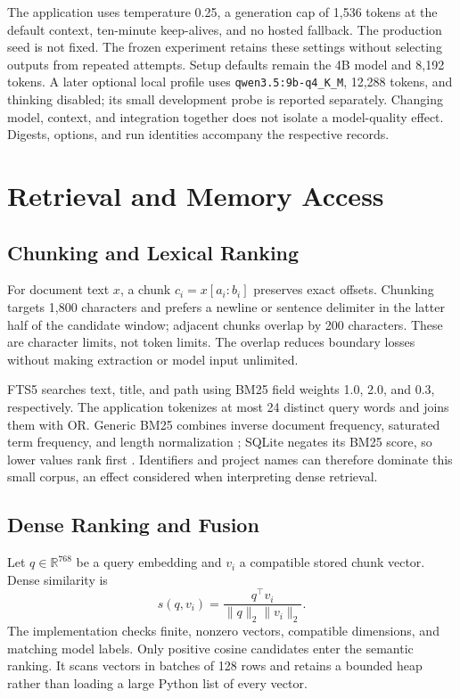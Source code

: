 \documentclass[conference,letterpaper]{IEEEtran}
\newcommand{\code}[1]{\texttt{#1}}
\begin{document}
The application uses temperature 0.25, a generation cap of 1,536 tokens at the default context, ten-minute keep-alives, and no hosted fallback. The production seed is not fixed. The frozen experiment retains these settings without selecting outputs from repeated attempts. Setup defaults remain the 4B model and 8,192 tokens. A later optional local profile uses \code{qwen3.5:9b-q4\_K\_M}, 12,288 tokens, and thinking disabled; its small development probe is reported separately. Changing model, context, and integration together does not isolate a model-quality effect. Digests, options, and run identities accompany the respective records.

\section{Retrieval and Memory Access}
\subsection{Chunking and Lexical Ranking}
For document text $x$, a chunk $c_i=x[a_i:b_i]$ preserves exact offsets. Chunking targets 1,800 characters and prefers a newline or sentence delimiter in the latter half of the candidate window; adjacent chunks overlap by 200 characters. These are character limits, not token limits. The overlap reduces boundary losses without making extraction or model input unlimited.

FTS5 searches text, title, and path using BM25 field weights 1.0, 2.0, and 0.3, respectively. The application tokenizes at most 24 distinct query words and joins them with OR. Generic BM25 combines inverse document frequency, saturated term frequency, and length normalization \cite{bm25}; SQLite negates its BM25 score, so lower values rank first \cite{sqlite}. Identifiers and project names can therefore dominate this small corpus, an effect considered when interpreting dense retrieval.

\subsection{Dense Ranking and Fusion}
Let $q\in\mathbb{R}^{768}$ be a query embedding and $v_i$ a compatible stored chunk vector. Dense similarity is
\begin{equation}
s(q,v_i)=\frac{q^\top v_i}{\lVert q\rVert_2\lVert v_i\rVert_2}.
\label{eq:cosine}
\end{equation}
The implementation checks finite, nonzero vectors, compatible dimensions, and matching model labels. Only positive cosine candidates enter the semantic ranking. It scans vectors in batches of 128 rows and retains a bounded heap rather than loading a large Python list of every vector.
\end{document}
